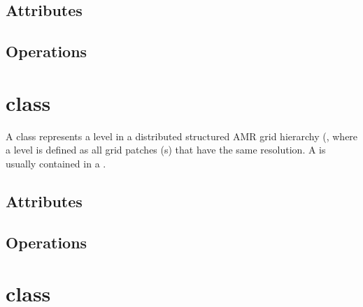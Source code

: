\subsection{Attributes}

\subsection{Operations}

\section{ class}

A  class represents a level in a distributed structured
AMR grid hierarchy (, where a level is defined as all
grid patches (s) that have the same resolution.  A
 is usually contained in a .


\subsection{Attributes}

\subsection{Operations}

\section{ class}

